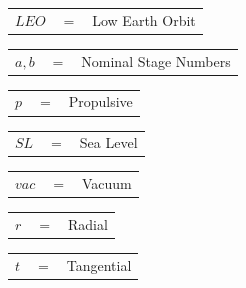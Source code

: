 \begin{tabular}{p{0.8cm}p{0.8cm}p{5.6cm}}
	$LEO$ & $=$ & Low Earth Orbit\\
\end{tabular}
\begin{tabular}{p{0.8cm}p{0.8cm}p{5.6cm}}
	$a,b$ & $=$ & Nominal Stage Numbers\\
\end{tabular} 
\begin{tabular}{p{0.8cm}p{0.8cm}p{5.6cm}}
	$p$ & $=$ & Propulsive\\
\end{tabular} 
\begin{tabular}{p{0.8cm}p{0.8cm}p{5.6cm}}
	$SL$ & $=$ & Sea Level\\
\end{tabular} 
\begin{tabular}{p{0.8cm}p{0.8cm}p{5.6cm}}
	$vac$ & $=$ & Vacuum\\
\end{tabular} 
\begin{tabular}{p{0.8cm}p{0.8cm}p{5.6cm}}
	$r$ & $=$ & Radial\\
\end{tabular} 
\begin{tabular}{p{0.8cm}p{0.8cm}p{5.6cm}}
	$t$ & $=$ & Tangential\\
\end{tabular} 

